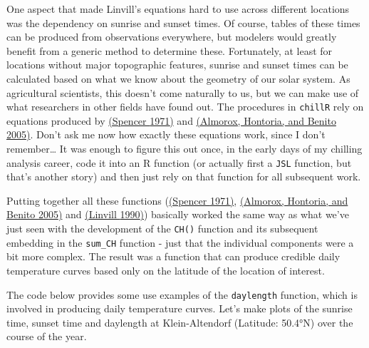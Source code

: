 \documentclass[
]{book}
\begin{document}
One aspect that made Linvill's equations hard to use across different locations was the dependency on sunrise and sunset times. Of course, tables of these times can be produced from observations everywhere, but modelers would greatly benefit from a generic method to determine these. Fortunately, at least for locations without major topographic features, sunrise and sunset times can be calculated based on what we know about the geometry of our solar system. As agricultural scientists, this doesn't come naturally to us, but we can make use of what researchers in other fields have found out. The procedures in \texttt{chillR} rely on equations produced by \href{https://www.mail-archive.com/sundial@uni-koeln.de/msg01050.html}{(Spencer \protect\hyperlink{ref-spencer1971fourier}{1971})} and \href{https://www.sciencedirect.com/science/article/abs/pii/S0196890404001992}{(Almorox, Hontoria, and Benito \protect\hyperlink{ref-almorox2005statistical}{2005})}. Don't ask me now how exactly these equations work, since I don't remember\ldots{} It was enough to figure this out once, in the early days of my chilling analysis career, code it into an R function (or actually first a \texttt{JSL} function, but that's another story) and then just rely on that function for all subsequent work.

Putting together all these functions (\href{https://www.mail-archive.com/sundial@uni-koeln.de/msg01050.html}{(Spencer \protect\hyperlink{ref-spencer1971fourier}{1971})}, \href{https://www.sciencedirect.com/science/article/abs/pii/S0196890404001992}{(Almorox, Hontoria, and Benito \protect\hyperlink{ref-almorox2005statistical}{2005})} and \href{https://journals.ashs.org/hortsci/view/journals/hortsci/25/1/article-p14.xml}{(Linvill \protect\hyperlink{ref-linvill1990calculating}{1990})}) basically worked the same way as what we've just seen with the development of the \texttt{CH()} function and its subsequent embedding in the \texttt{sum\_CH} function - just that the individual components were a bit more complex. The result was a function that can produce credible daily temperature curves based only on the latitude of the location of interest.

The code below provides some use examples of the \texttt{daylength} function, which is involved in producing daily temperature curves. Let's make plots of the sunrise time, sunset time and daylength at Klein-Altendorf (Latitude: 50.4°N) over the course of the year.
\end{document}
